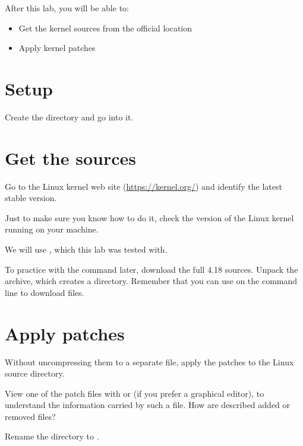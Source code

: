 
After this lab, you will be able to:
\begin{itemize}
\item Get the kernel sources from the official location
\item Apply kernel patches
\end{itemize}

\section{Setup}

Create the  directory and go into it.

\section{Get the sources}

Go to the Linux kernel web site (\url{https://kernel.org/}) and
identify the latest stable version.

Just to make sure you know how to do it, check the version of the
Linux kernel running on your machine.

We will use , which this lab was tested with.

To practice with the  command later, download the full 4.18
sources. Unpack the archive, which creates a 
directory. Remember that you can use  on the command
line to download files.

\section{Apply patches}


Without uncompressing them to a separate file, apply the patches to the Linux
source directory.


View one of the patch files with  or 
(if you prefer a graphical editor), to understand the information carried
by such a file. How are described added or removed files?

Rename the  directory to .
